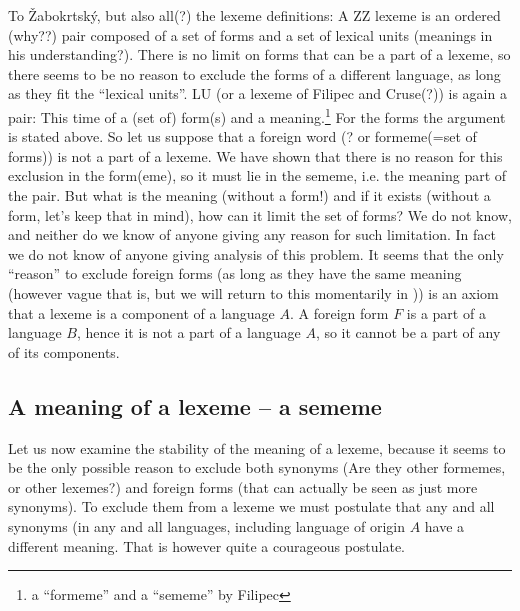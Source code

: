 To Žabokrtský, but also all(?) the lexeme definitions: A ZZ lexeme is an ordered (why??) pair composed of a set of forms and a set of lexical units (meanings in his understanding?). There is no limit on forms that can be a part of a lexeme, so there seems to be no reason to exclude the forms of a different language, as long as they fit the ``lexical units''. LU (or a lexeme of Filipec and Cruse(?)) is again a pair: This time of a (set of) form(s) and a meaning.\footnote{a ``formeme'' and a ``sememe'' by Filipec} For the forms the argument is stated above. So let us suppose that a foreign word (? or formeme(=set of forms)) is not a part of a lexeme. We have shown that there is no reason for this exclusion in the form(eme), so it must lie in the sememe, i.e. the meaning part of the pair. But what is the meaning (without a form!) and if it exists (without a form, let's keep that in mind), how can it limit the set of forms? We do not know, and neither do we know of anyone giving any reason for such limitation. In fact we do not know of anyone giving analysis of this problem. It seems that the only ``reason'' to exclude foreign forms (as long as they have the same meaning (however vague that is, but we will return to this momentarily in )) is an axiom that a lexeme is a component of a language $A$. A foreign form $F$ is a part of a language $B$, hence it is not a part of a language $A$, so it cannot be a part of any of its components.

\subsection{A meaning of a lexeme -- a sememe}
\label{sec:meaning-stability}
Let us now examine the stability of the meaning of a lexeme, because it seems to be the only possible reason to exclude both synonyms (Are they other formemes, or other lexemes?) and foreign forms (that can actually be seen as just more synonyms). To exclude them from a lexeme we must postulate that any and all synonyms (in any and all languages, including language of origin $A$ have a different meaning. That is however quite a courageous postulate.
